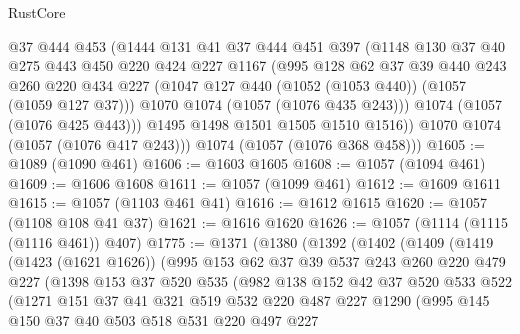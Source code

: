 \begin{lexlean}{RustCore}
\begin{coremodule}
          @37
          @444
          @453
          (@1444
            @131
            @41
            @37
            @444
            @451
            @397
            (@1148
              @130
              @37
              @40
              @275
              @443
              @450
              @220
              @424
              @227
              @1167
              (@995
                @128
                @62
                @37
                @39
                @440
                @243
                @260
                @220
                @434
                @227
                (@1047 @127 @440 (@1052 (@1053 @440)) (@1057 (@1059 @127 @37)))
                @1070
                @1074
                (@1057 (@1076 @435 @243)))
              @1074
              (@1057 (@1076 @425 @443)))
            @1495
            @1498
            @1501
            @1505
            @1510
            @1516))
        @1070
        @1074
        (@1057 (@1076 @417 @243)))
      @1074
      (@1057 (@1076 @368 @458)))
@1605 := @1089 (@1090 @461)
@1606 := @1603 @1605
@1608 := @1057 (@1094 @461)
@1609 := @1606 @1608
@1611 := @1057 (@1099 @461)
@1612 := @1609 @1611
@1615 := @1057 (@1103 @461 @41)
@1616 := @1612 @1615
@1620 := @1057 (@1108 @108 @41 @37)
@1621 := @1616 @1620
@1626 := @1057 (@1114 (@1115 (@1116 @461)) @407)
@1775 := @1371
    (@1380
      (@1392
        (@1402
          (@1409
            (@1419
              (@1423 (@1621 @1626))
              (@995
                @153
                @62
                @37
                @39
                @537
                @243
                @260
                @220
                @479
                @227
                (@1398
                  @153
                  @37
                  @520
                  @535
                  (@982
                    @138
                    @152
                    @42
                    @37
                    @520
                    @533
                    @522
                    (@1271
                      @151
                      @37
                      @41
                      @321
                      @519
                      @532
                      @220
                      @487
                      @227
                      @1290
                      (@995
                        @145
                        @150
                        @37
                        @40
                        @503
                        @518
                        @531
                        @220
                        @497
                        @227

\end{coremodule}
\end{lexlean}
